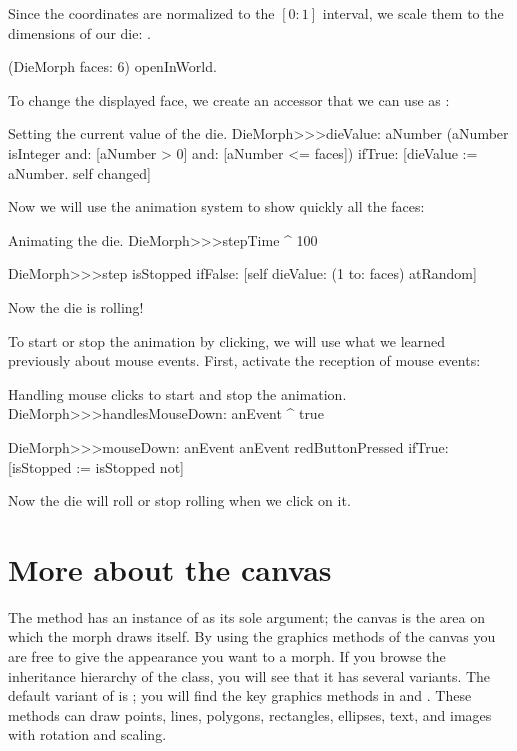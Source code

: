 \documentclass[a4paper,10pt,twoside]{book}
\begin{document}
Since the coordinates are normalized to the $[0{:}1]$ interval, we scale them to the dimensions of our die: .

\begin{code}{}
(DieMorph faces: 6) openInWorld.
\end{code}

To change the displayed face, we create an accessor that we can use as :
\begin{method}{Setting the current value of the die.}
DieMorph>>>dieValue: aNumber
	(aNumber isInteger
			and: [aNumber > 0]
			and: [aNumber <= faces])
		ifTrue:
			[dieValue := aNumber.
			self changed]
\end{method}

Now we will use the animation system to show quickly all the faces:
\begin{methods}{Animating the die.}
DieMorph>>>stepTime
	^ 100

DieMorph>>>step
	isStopped ifFalse: [self dieValue: (1 to: faces) atRandom]
\end{methods}
Now the die is rolling!

To start or stop the animation by clicking, we will use what we learned previously about mouse events.
First, activate the reception of mouse events:

\begin{methods}{Handling mouse clicks to start and stop the animation.}
DieMorph>>>handlesMouseDown: anEvent
	^ true

DieMorph>>>mouseDown: anEvent
	anEvent redButtonPressed
		ifTrue: [isStopped := isStopped not]
\end{methods}
Now the die will roll or stop rolling when we click on it.



\section{More about the canvas}

The  method has an instance of  as its sole argument;
the canvas is the area on which the morph draws itself.
By using the graphics methods of the canvas you are free to give the appearance you want to a morph.
If you browse the inheritance hierarchy of the  class, you will see that it has several variants.
The default variant of  is ; you will find the key graphics methods in  and .
These methods can draw points, lines, polygons, rectangles, ellipses, text, and images with rotation and scaling.
\end{document}
